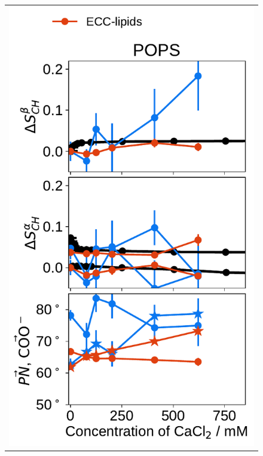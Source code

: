 \documentclass[journal=jpcbfk,manuscript=article]{achemso}
\newlength{\figheightsmall}
\newlength{\figheight}
\begin{document}
\begin{figure}[tbp!]
\begin{tabular}{ c }
  \includegraphics[height=1.5\figheightsmall]{../img/ecc_pops/order_parameters_changes_ecc-lip_L14_A-B-PN-COO_POPS_cacl.pdf} 
  \end{tabular}

\end{figure}
\end{document}
